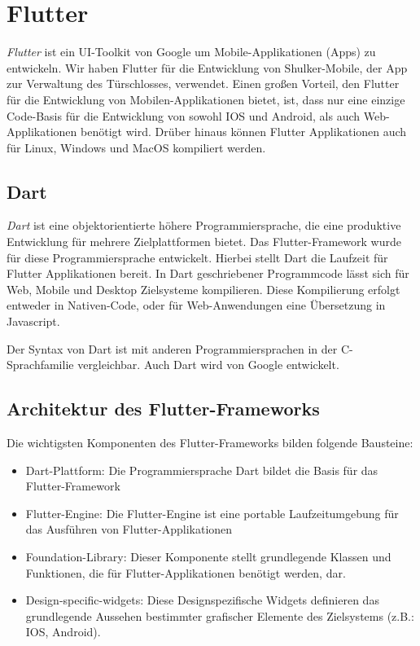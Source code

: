 \color{BlueViolet}
\section{Flutter}
\label{flutter}
\textit{Flutter} ist ein UI-Toolkit von Google um Mobile-Applikationen (Apps) zu entwickeln.
Wir haben Flutter für die Entwicklung von Shulker-Mobile, der App zur Verwaltung des Türschlosses, verwendet.
Einen großen Vorteil, den Flutter für die Entwicklung von Mobilen-Applikationen bietet, ist, 
dass nur eine einzige Code-Basis für die Entwicklung von sowohl IOS und Android, als auch Web-Applikationen benötigt wird.
Drüber hinaus können Flutter Applikationen auch für Linux, Windows und MacOS kompiliert werden. 
\cite{flutterwikipediaEN}

\subsection{Dart}
\textit{Dart} ist eine objektorientierte höhere Programmiersprache, die eine produktive Entwicklung für
mehrere Zielplattformen bietet. Das Flutter-Framework wurde für diese Programmiersprache entwickelt.
Hierbei stellt Dart die Laufzeit für Flutter Applikationen bereit.
In Dart geschriebener Programmcode lässt sich für Web, Mobile und Desktop Zielsysteme kompilieren. 
Diese Kompilierung erfolgt entweder in Nativen-Code, oder für Web-Anwendungen eine Übersetzung in Javascript.

Der Syntax von Dart ist mit anderen Programmiersprachen in der C-Sprachfamilie vergleichbar.
Auch Dart wird von Google entwickelt.
\cite{dartwikipedia}

\subsection{Architektur des Flutter-Frameworks}
Die wichtigsten Komponenten des Flutter-Frameworks bilden folgende Bausteine: \cite{flutterwikipediaEN}
\begin{itemize}
    \item Dart-Plattform: Die Programmiersprache Dart bildet die Basis für das Flutter-Framework
    \item Flutter-Engine: Die Flutter-Engine ist eine portable Laufzeitumgebung für das Ausführen von Flutter-Applikationen
    \item Foundation-Library: Dieser Komponente stellt grundlegende Klassen und Funktionen, die für 
    Flutter-Applikationen benötigt werden, dar.
    \item Design-specific-widgets: Diese Designspezifische Widgets definieren das grundlegende Aussehen
    bestimmter grafischer Elemente des Zielsystems (z.B.: IOS, Android).
\end{itemize}

